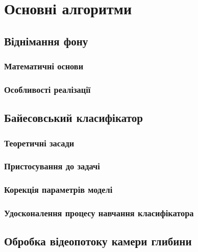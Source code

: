 \section{Основні алгоритми}
\subsection{Віднімання фону}
\subsubsection{Математичні основи}
\subsubsection{Особливості реалізації}
\subsection{Байесовський класифікатор}
\subsubsection{Теоретичні засади}
\subsubsection{Пристосування до задачі}
\subsubsection{Корекція параметрів моделі}
\subsubsection{Удосконалення процесу навчання класифікатора}
\subsection{Обробка відеопотоку камери глибини}
